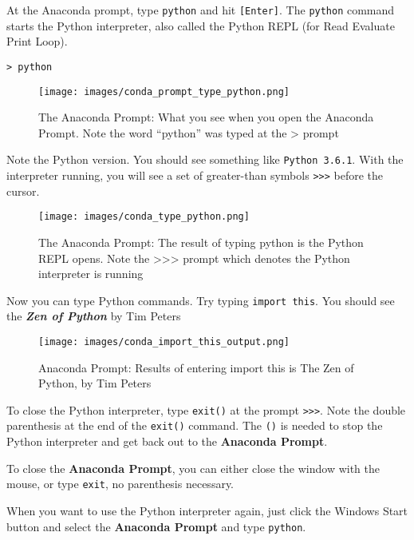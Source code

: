 \documentclass{book}
\makeatletter
\def\maxwidth{\ifdim\Gin@nat@width>\linewidth\linewidth
\else\Gin@nat@width\fi}
\let\Oldincludegraphics\includegraphics
\renewcommand{\includegraphics}[1]{\Oldincludegraphics[width=.8\maxwidth]{#1}}
\newcommand{\passthrough}[1]{#1}
\makeatother
\begin{document}
At the Anaconda prompt, type \passthrough{\lstinline!python!} and hit
\passthrough{\lstinline![Enter]!}. The \passthrough{\lstinline!python!}
command starts the Python interpreter, also called the Python REPL (for
Read Evaluate Print Loop).

\begin{lstlisting}
> python
\end{lstlisting}

\begin{figure}
\centering
\texttt{[image: images/conda\_prompt\_type\_python.png]}
\caption{The Anaconda Prompt: What you see when you open the Anaconda
Prompt. Note the word ``python'' was typed at the \textgreater{} prompt}
\end{figure}

Note the Python version. You should see something like
\passthrough{\lstinline!Python 3.6.1!}. With the interpreter running,
you will see a set of greater-than symbols \passthrough{\lstinline!>>>!}
before the cursor.

\begin{figure}
\centering
\texttt{[image: images/conda\_type\_python.png]}
\caption{The Anaconda Prompt: The result of typing python is the Python
REPL opens. Note the \textgreater{}\textgreater{}\textgreater{} prompt
which denotes the Python interpreter is running}
\end{figure}

Now you can type Python commands. Try typing
\passthrough{\lstinline!import this!}. You should see the
\textbf{\emph{Zen of Python}} by Tim Peters

\begin{figure}
\centering
\texttt{[image: images/conda\_import\_this\_output.png]}
\caption{Anaconda Prompt: Results of entering import this is The Zen of
Python, by Tim Peters}
\end{figure}

To close the Python interpreter, type \passthrough{\lstinline!exit()!}
at the prompt \passthrough{\lstinline!>>>!}. Note the double parenthesis
at the end of the \passthrough{\lstinline!exit()!} command. The
\passthrough{\lstinline!()!} is needed to stop the Python interpreter
and get back out to the \textbf{Anaconda Prompt}.

To close the \textbf{Anaconda Prompt}, you can either close the window
with the mouse, or type \passthrough{\lstinline!exit!}, no parenthesis
necessary.

When you want to use the Python interpreter again, just click the
Windows Start button and select the \textbf{Anaconda Prompt} and type
\passthrough{\lstinline!python!}.
    
\end{document}
